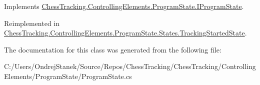 Implements \mbox{\hyperlink{interface_chess_tracking_1_1_controlling_elements_1_1_program_state_1_1_i_program_state_ae544420adecf8b0f6a58863cb3f89b1a}{Chess\+Tracking.\+Controlling\+Elements.\+Program\+State.\+I\+Program\+State}}.



Reimplemented in \mbox{\hyperlink{class_chess_tracking_1_1_controlling_elements_1_1_program_state_1_1_states_1_1_tracking_started_state_aa1840f95aae0d1aa49a898b1387bdda5}{Chess\+Tracking.\+Controlling\+Elements.\+Program\+State.\+States.\+Tracking\+Started\+State}}.



The documentation for this class was generated from the following file\+:\begin{DoxyCompactItemize}
\item 
C\+:/\+Users/\+Ondrej\+Stanek/\+Source/\+Repos/\+Chess\+Tracking/\+Chess\+Tracking/\+Controlling\+Elements/\+Program\+State/Program\+State.\+cs\end{DoxyCompactItemize}
